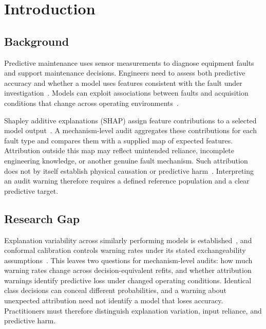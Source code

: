 \documentclass[conference]{IEEEtran}
\begin{document}
\section{Introduction}
\label{sec:introduction}
\subsection{Background}
Predictive maintenance uses sensor measurements to diagnose equipment faults and support maintenance decisions. Engineers need to assess both predictive accuracy and whether a model uses features consistent with the fault under investigation~\cite{matzka2020explainable,cummins2024survey}. Models can exploit associations between faults and acquisition conditions that change across operating environments~\cite{geirhos2020shortcut,lapuschkin2019unmasking}.

Shapley additive explanations (SHAP) assign feature contributions to a selected model output~\cite{lundberg2017shap}. A mechanism-level audit aggregates these contributions for each fault type and compares them with a supplied map of expected features. Attribution outside this map may reflect unintended reliance, incomplete engineering knowledge, or another genuine fault mechanism. Such attribution does not by itself establish physical causation or predictive harm~\cite{kumar2020problems}. Interpreting an audit warning therefore requires a defined reference population and a clear predictive target.

\subsection{Research Gap}
Explanation variability across similarly performing models is established~\cite{brunet2022indeterminacy}, and conformal calibration controls warning rates under its stated exchangeability assumptions~\cite{angelopoulos2023conformal}. This leaves two questions for mechanism-level audits: how much warning rates change across decision-equivalent refits, and whether attribution warnings identify predictive loss under changed operating conditions. Identical class decisions can conceal different probabilities, and a warning about unexpected attribution need not identify a model that loses accuracy. Practitioners must therefore distinguish explanation variation, input reliance, and predictive harm.
\end{document}
